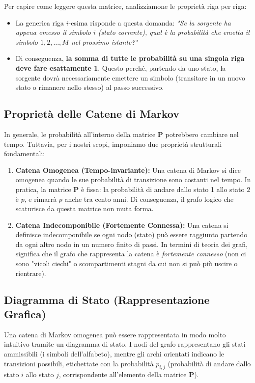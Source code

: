 Per capire come leggere questa matrice, analizziamone le proprietà riga per riga:
\begin{itemize}
    \item La generica riga $i$-esima risponde a questa domanda: \textit{"Se la sorgente ha appena emesso il simbolo $i$ (stato corrente), qual è la probabilità che emetta il simbolo $1, 2, \dots, M$ nel prossimo istante?"}
    \item Di conseguenza, \textbf{la somma di tutte le probabilità su una singola riga deve fare esattamente 1}. Questo perché, partendo da uno stato, la sorgente dovrà necessariamente emettere un simbolo (transitare in un nuovo stato o rimanere nello stesso) al passo successivo.
\end{itemize}

\subsection{Proprietà delle Catene di Markov}

In generale, le probabilità all'interno della matrice $\mathbf{P}$ potrebbero cambiare nel tempo. Tuttavia, per i nostri scopi, imponiamo due proprietà strutturali fondamentali:

\begin{enumerate}
    \item \textbf{Catena Omogenea (Tempo-invariante):} Una catena di Markov si dice omogenea quando le sue probabilità di transizione sono costanti nel tempo. In pratica, la matrice $\mathbf{P}$ è fissa: la probabilità di andare dallo stato 1 allo stato 2 è $p$, e rimarrà $p$ anche tra cento anni. Di conseguenza, il grafo logico che scaturisce da questa matrice non muta forma.
    \item \textbf{Catena Indecomponibile (Fortemente Connessa):} Una catena si definisce indecomponibile se ogni nodo (stato) può essere raggiunto partendo da ogni altro nodo in un numero finito di passi. In termini di teoria dei grafi, significa che il grafo che rappresenta la catena è \textit{fortemente connesso} (non ci sono "vicoli ciechi" o scompartimenti stagni da cui non si può più uscire o rientrare).
\end{enumerate}

\subsection{Diagramma di Stato (Rappresentazione Grafica)}

Una catena di Markov omogenea può essere rappresentata in modo molto intuitivo tramite un diagramma di stato. I nodi del grafo rappresentano gli stati ammissibili (i simboli dell'alfabeto), mentre gli archi orientati indicano le transizioni possibili, etichettate con la probabilità $p_{i,j}$ (probabilità di andare dallo stato $i$ allo stato $j$, corrispondente all'elemento della matrice $\mathbf{P}$).


